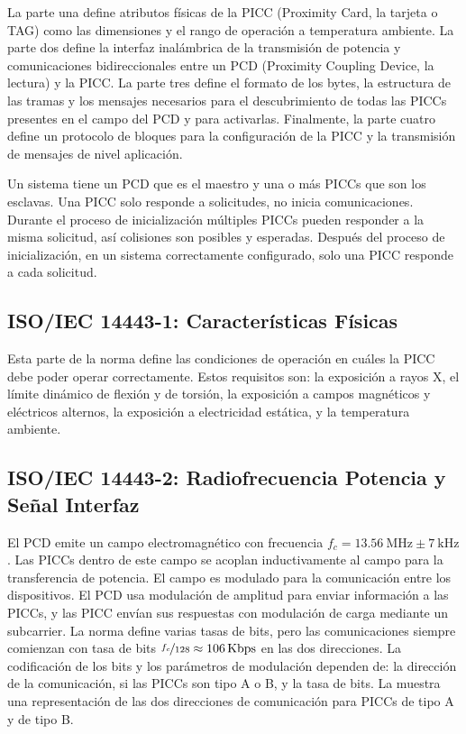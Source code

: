 \documentclass[a4paper, twoside, 11pt]{report}
\begin{document}
La parte una define atributos físicas de la PICC (Proximity Card, la tarjeta o TAG) como las dimensiones y el rango de operación a temperatura ambiente. La parte dos define la interfaz inalámbrica de la transmisión de potencia y comunicaciones bidireccionales entre un PCD (Proximity Coupling Device, la lectura) y la PICC. La parte tres define el formato de los bytes, la estructura de las tramas y los mensajes necesarios para el descubrimiento de todas las PICCs presentes en el campo del PCD y para activarlas. Finalmente, la parte cuatro define un protocolo de bloques para la configuración de la PICC y la transmisión de mensajes de nivel aplicación.

Un sistema tiene un PCD que es el maestro y una o más PICCs que son los esclavas. Una PICC solo responde a solicitudes, no inicia comunicaciones. Durante el proceso de inicialización múltiples PICCs pueden responder a la misma solicitud, así colisiones son posibles y esperadas. Después del proceso de inicialización, en un sistema correctamente configurado, solo una PICC responde a cada solicitud.

\FloatBarrier
\subsection{ISO/IEC 14443-1: \large{Características Físicas}}

Esta parte de la norma define las condiciones de operación en cuáles la PICC debe poder operar correctamente. Estos requisitos son: la exposición a rayos X, el límite dinámico de flexión y de torsión, la exposición a campos magnéticos y eléctricos alternos, la exposición a electricidad estática, y la temperatura ambiente\cite{iso14443-1}.

\FloatBarrier
\subsection{ISO/IEC 14443-2: \large{Radiofrecuencia Potencia y Señal Interfaz}}
\label{sec:introduction_iso14443-2}

El PCD emite un campo electromagnético con frecuencia $f_c = \SI{13.56}{\mega\hertz} \pm \SI{7}{\kilo\hertz}$. Las PICCs dentro de este campo se acoplan inductivamente al campo para la transferencia de potencia. El campo es modulado para la comunicación entre los dispositivos. El PCD usa modulación de amplitud para enviar información a las PICCs, y las PICC envían sus respuestas con modulación de carga mediante un subcarrier. La norma define varias tasas de bits, pero las comunicaciones siempre comienzan con tasa de bits $\nicefrac{f_c}{128} \approx \SI{106}{Kbps}$ en las dos direcciones. La codificación de los bits y los parámetros de modulación dependen de: la dirección de la comunicación, si las PICCs son tipo A o B, y la tasa de bits. La  muestra una representación de las dos direcciones de comunicación para PICCs de tipo A y de tipo B.
\end{document}
